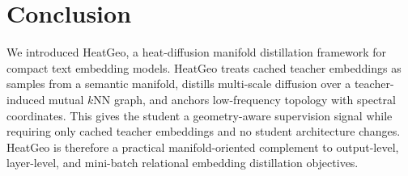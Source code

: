 \section{Conclusion}

We introduced HeatGeo, a heat-diffusion manifold distillation framework for compact text embedding models. HeatGeo treats cached teacher embeddings as samples from a semantic manifold, distills multi-scale diffusion over a teacher-induced mutual $k$NN graph, and anchors low-frequency topology with spectral coordinates. This gives the student a geometry-aware supervision signal while requiring only cached teacher embeddings and no student architecture changes. HeatGeo is therefore a practical manifold-oriented complement to output-level, layer-level, and mini-batch relational embedding distillation objectives.
